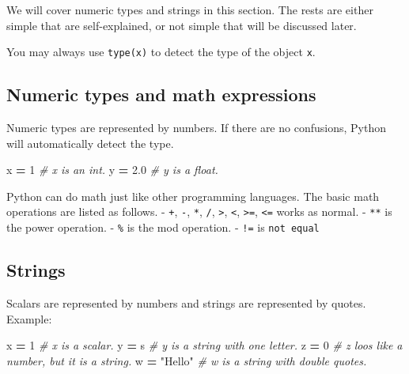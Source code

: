 \documentclass[
]{book}
\newenvironment{Shaded}{\begin{snugshade}}{\end{snugshade}}
\newcommand{\CommentTok}[1]{\textcolor[rgb]{0.56,0.35,0.01}{\textit{#1}}}
\newcommand{\DecValTok}[1]{\textcolor[rgb]{0.00,0.00,0.81}{#1}}
\newcommand{\FloatTok}[1]{\textcolor[rgb]{0.00,0.00,0.81}{#1}}
\newcommand{\NormalTok}[1]{#1}
\newcommand{\OperatorTok}[1]{\textcolor[rgb]{0.81,0.36,0.00}{\textbf{#1}}}
\newcommand{\StringTok}[1]{\textcolor[rgb]{0.31,0.60,0.02}{#1}}
\begin{document}
We will cover numeric types and strings in this section. The rests are either simple that are self-explained, or not simple that will be discussed later.

You may always use \texttt{type(x)} to detect the type of the object \texttt{x}.

\hypertarget{numeric-types-and-math-expressions}{%
\subsection{Numeric types and math expressions}\label{numeric-types-and-math-expressions}}

Numeric types are represented by numbers. If there are no confusions, Python will automatically detect the type.

\begin{Shaded}
\begin{Highlighting}[]
\NormalTok{x }\OperatorTok{=} \DecValTok{1} \CommentTok{\# x is an int.}
\NormalTok{y }\OperatorTok{=} \FloatTok{2.0} \CommentTok{\# y is a float.}
\end{Highlighting}
\end{Shaded}

Python can do math just like other programming languages. The basic math operations are listed as follows.
- \texttt{+}, \texttt{-}, \texttt{*}, \texttt{/}, \texttt{\textgreater{}}, \texttt{\textless{}}, \texttt{\textgreater{}=}, \texttt{\textless{}=} works as normal.
- \texttt{**} is the power operation.
- \texttt{\%} is the mod operation.
- \texttt{!=} is \texttt{not\ equal}

\hypertarget{strings}{%
\subsection{Strings}\label{strings}}

Scalars are represented by numbers and strings are represented by quotes. Example:

\begin{Shaded}
\begin{Highlighting}[]
\NormalTok{x }\OperatorTok{=} \DecValTok{1}       \CommentTok{\# x is a scalar.}
\NormalTok{y }\OperatorTok{=} \StringTok{\textquotesingle{}s\textquotesingle{}}     \CommentTok{\# y is a string with one letter.}
\NormalTok{z }\OperatorTok{=} \StringTok{\textquotesingle{}0\textquotesingle{}}     \CommentTok{\# z loos like a number, but it is a string.}
\NormalTok{w }\OperatorTok{=} \StringTok{"Hello"} \CommentTok{\# w is a string with double quotes.}
\end{Highlighting}
\end{Shaded}
\end{document}

